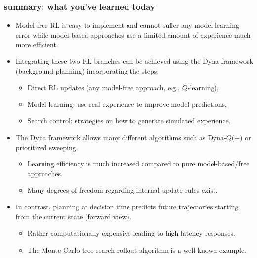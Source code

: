 \begin{frame}
\frametitle{summary: what you've learned today}
\begin{itemize}
	\item Model-free RL is easy to implement and cannot suffer any model learning error while model-based approaches use a limited amount of experience much more efficient. \pause
	\item Integrating these two RL branches can be achieved using the Dyna framework (background planning) incorporating the steps:
	\begin{itemize}
		\item Direct RL updates (any model-free approach, e.g., $Q$-learning),
		\item Model learning: use real experience to improve model predictions,
		\item Search control: strategies on how to generate simulated experience. \pause
	\end{itemize}
	\item The Dyna framework allows many different algorithms such as Dyna-$Q$(+) or prioritized sweeping.
	\begin{itemize}
		\item Learning efficiency is much increased compared to pure model-based/free approaches.
		\item Many degrees of freedom regarding internal update rules exist.\pause 
	\end{itemize}
	\item In contrast, planning at decision time predicts future trajectories starting from the current state (forward view).
	\begin{itemize}
		\item Rather computationally expensive leading to high latency responses.
		\item The Monte Carlo tree search rollout algorithm is a well-known example.
	\end{itemize}
\end{itemize}
\end{frame}